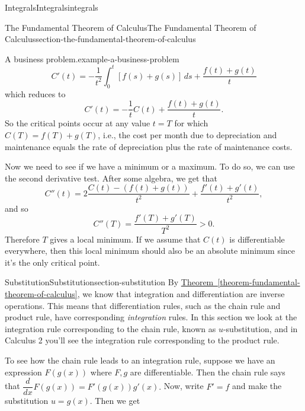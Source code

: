 \documentclass[oneside,10pt,]{book}
\numberwithin{equation}{section}
\newcommand{\dv}[3][]{\dfrac{d^{#1} #2}{d #3^{#1}}}
\begin{document}
\begin{chapterptx}{Integrals}{}{Integrals}{}{}{integrals}
\begin{sectionptx}{The Fundamental Theorem of Calculus}{}{The Fundamental Theorem of Calculus}{}{}{section-the-fundamental-theorem-of-calculus}
\begin{example}{A business problem.}{example-a-business-problem}
\begin{equation*}
C'(t) = -\frac{1}{t^{2}}\int_{0}^{t}[f(s)+g(s)]\,ds + \frac{f(t) + g(t)}{t}
\end{equation*}
which reduces to%
\begin{equation*}
C'(t) = -\frac{1}{t}C(t) + \frac{f(t) + g(t)}{t}.
\end{equation*}
So the critical points occur at any value \(t = T\) for which \(C(T) = f(T) + g(T)\), i.e., the cost per month due to depreciation and maintenance equals the rate of depreciation plus the rate of maintenance costs.%
\par
\hypertarget{p-476}{}%
Now we need to see if we have a minimum or a maximum. To do so, we can use the second derivative test. After some algebra, we get that%
\begin{equation*}
C''(t) = 2\frac{C(t) - (f(t) + g(t))}{t^{2}} + \frac{f'(t) + g'(t)}{t^{2}},
\end{equation*}
and so%
\begin{equation*}
C''(T) = \frac{f'(T) + g'(T)}{T^{2}} >0.
\end{equation*}
Therefore \(T\) gives a local minimum. If we assume that \(C(t)\) is differentiable everywhere, then this local minimum should also be an absolute minimum since it's the only critical point.%
\end{example}
\end{sectionptx}
%
%
\typeout{************************************************}
\typeout{************************************************}
%
\begin{sectionptx}{Substitution}{}{Substitution}{}{}{section-substitution}
\hypertarget{p-477}{}%
By \hyperref[theorem-fundamental-theorem-of-calculus]{Theorem~\ref{theorem-fundamental-theorem-of-calculus}}, we know that integration and differentiation are inverse operations. This means that differentiation rules, such as the chain rule and product rule, have corresponding \emph{integration} rules. In this section we look at the integration rule corresponding to the chain rule, known as \(u\)-substitution, and in Calculus 2 you'll see the integration rule corresponding to the product rule.%
\par
\hypertarget{p-478}{}%
To see how the chain rule leads to an integration rule, suppose we have an expression \(F(g(x))\) where \(F,g\) are differentiable. Then the chain rule says that \(\dv{}{x}F(g(x)) = F'(g(x))g'(x).\) Now, write \(F' = f\) and make the substitution \(u = g(x)\). Then we get%
\begin{equation*}

\end{equation*}
\end{sectionptx}
\end{chapterptx}
\end{document}

